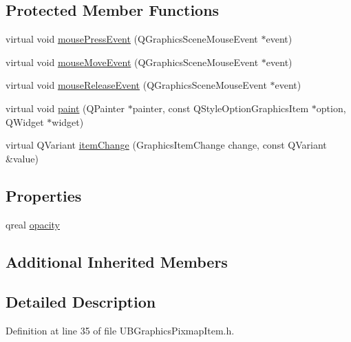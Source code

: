 \subsection*{Protected Member Functions}
\begin{DoxyCompactItemize}
\item 
virtual void \hyperlink{class_u_b_graphics_pixmap_item_abc02c570ead1a49248766c09e27fb6aa}{mouse\-Press\-Event} (Q\-Graphics\-Scene\-Mouse\-Event $\ast$event)
\item 
virtual void \hyperlink{class_u_b_graphics_pixmap_item_a6efcb9a45ca5d0c58e52ba5d52afe3c7}{mouse\-Move\-Event} (Q\-Graphics\-Scene\-Mouse\-Event $\ast$event)
\item 
virtual void \hyperlink{class_u_b_graphics_pixmap_item_aebf8be8d5a240e5a3b45fd56437ee172}{mouse\-Release\-Event} (Q\-Graphics\-Scene\-Mouse\-Event $\ast$event)
\item 
virtual void \hyperlink{class_u_b_graphics_pixmap_item_a181a5e9658c1edfe0f0088dadf1a329e}{paint} (Q\-Painter $\ast$painter, const Q\-Style\-Option\-Graphics\-Item $\ast$option, Q\-Widget $\ast$widget)
\item 
virtual Q\-Variant \hyperlink{class_u_b_graphics_pixmap_item_a18a321417a7b593ef9a9d3966ada34d6}{item\-Change} (Graphics\-Item\-Change change, const Q\-Variant \&value)
\end{DoxyCompactItemize}
\subsection*{Properties}
\begin{DoxyCompactItemize}
\item 
qreal \hyperlink{class_u_b_graphics_pixmap_item_a965ce3a929fe1681dc146b7f79322ced}{opacity}
\end{DoxyCompactItemize}
\subsection*{Additional Inherited Members}


\subsection{Detailed Description}


Definition at line 35 of file U\-B\-Graphics\-Pixmap\-Item.\-h.



